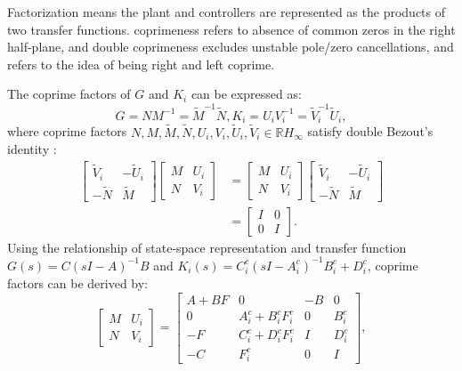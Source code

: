 \documentclass[journal]{IEEEtran}
\begin{document}
Factorization means the plant and controllers are represented as the products of two transfer functions. coprimeness refers to absence of common zeros in the right half-plane, and double coprimeness excludes unstable pole/zero cancellations, and refers to the idea of being right and left coprime.

The coprime factors of $G$ and $K_i$ can be expressed as:
\begin{equation}
  G=N M^{-1}=\tilde{M}^{-1} \tilde{N}, K_{i}=U_{i} V_{i}^{-1}=\tilde{V}_{i}^{-1} \tilde{U}_{i},
\end{equation}
where coprime factors $N, M, \tilde{M}, \tilde{N}, U_{i}, V_{i}, \tilde{U}_{i}, \tilde{V}_{i} \in \mathbb{R} H_{\infty}$ satisfy double Bezout's identity \citep{pommaret1998generalized}:
\begin{equation}
  \begin{aligned}
    \left[\begin{array}{cc}
        \tilde{V}_{i} & -\tilde{U}_{i} \\
        -\tilde{N}    & \tilde{M}
      \end{array}\right]\left[\begin{array}{cc}
        M & U_{i} \\
        N & V_{i}
      \end{array}\right]
     & =\left[\begin{array}{cc}
        M & U_{i} \\
        N & V_{i}
      \end{array}\right]\left[\begin{array}{cc}
        \tilde{V}_{i} & -\tilde{U}_{i} \\
        -\tilde{N}    & \tilde{M}
      \end{array}\right] \\
     & =\left[\begin{array}{cc}
        I & 0 \\
        0 & I
      \end{array}\right].
  \end{aligned}
  \label{Eq16}
\end{equation}
Using the relationship of state-space representation and transfer function $G(s)=C(sI-A)^{-1} B$ and $K_i (s)=C_i^c (sI-A_i^c)^{-1} B_i^c+D_i^c$, coprime factors can be derived by:
\begin{equation}
  \left[\begin{array}{cc}
      M & U_{i} \\
      N & V_{i}
    \end{array}\right]=\left[\begin{array}{cc|cc}
      A+B F     & 0                             & -B & 0         \\
      0         & A_{i}^{c}+B_{i}^{c} F_{i}^{c} & 0  & B_{i}^{c} \\
      \hline -F & C_{i}^{c}+D_{i}^{c} F_{i}^{c} & I  & D_{i}^{c} \\
      -C        & F_{i}^{c}                     & 0  & I
    \end{array}\right],
  \label{Eq17}
\end{equation}
\end{document}
